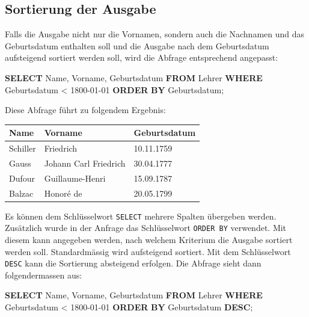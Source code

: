 \documentclass[
  nswissgerman,
  a4paper,
  DIV=11,
  numbers=noendperiod,
  ngerman]{scrreprt}
\newenvironment{Shaded}{\begin{snugshade}}{\end{snugshade}}
\newcommand{\KeywordTok}[1]{\textcolor[rgb]{0.00,0.23,0.31}{\textbf{#1}}}
\newcommand{\NormalTok}[1]{\textcolor[rgb]{0.00,0.23,0.31}{#1}}
\newcommand{\OperatorTok}[1]{\textcolor[rgb]{0.37,0.37,0.37}{#1}}
\newcommand{\StringTok}[1]{\textcolor[rgb]{0.13,0.47,0.30}{#1}}
\newcounter{none} %
\begin{document}
\subsection{Sortierung der Ausgabe}\label{sortierung-der-ausgabe}

Falls die Ausgabe nicht nur die Vornamen, sondern auch die Nachnamen und
das Geburtsdatum enthalten soll und die Ausgabe nach dem Geburtsdatum
aufsteigend sortiert werden soll, wird die Abfrage entsprechend
angepasst:

\begin{Shaded}
\begin{Highlighting}[numbers=left,,]
\KeywordTok{SELECT}\NormalTok{ Name, Vorname, Geburtsdatum}
\KeywordTok{FROM}\NormalTok{ Lehrer}
\KeywordTok{WHERE}\NormalTok{ Geburtsdatum }\OperatorTok{\textless{}} \StringTok{\textquotesingle{}1800{-}01{-}01\textquotesingle{}}
\KeywordTok{ORDER} \KeywordTok{BY}\NormalTok{ Geburtsdatum;}
\end{Highlighting}
\end{Shaded}

Diese Abfrage führt zu folgendem Ergebnis:

{\def\LTcaptype{none} %
\begin{longtable}[]{@{}lll@{}}
\toprule\noalign{}
Name & Vorname & Geburtsdatum \\
\midrule\noalign{}
\endhead
\bottomrule\noalign{}
\endlastfoot
Schiller & Friedrich & 10.11.1759 \\
Gauss & Johann Carl Friedrich & 30.04.1777 \\
Dufour & Guillaume-Henri & 15.09.1787 \\
Balzac & Honoré de & 20.05.1799 \\
\end{longtable}
}

Es können dem Schlüsselwort \texttt{SELECT} mehrere Spalten übergeben
werden. Zusätzlich wurde in der Anfrage das Schlüsselwort
\texttt{ORDER\ BY} verwendet. Mit diesem kann angegeben werden, nach
welchem Kriterium die Ausgabe sortiert werden soll. Standardmässig wird
aufsteigend sortiert. Mit dem Schlüsselwort \texttt{DESC} kann die
Sortierung absteigend erfolgen. Die Abfrage sieht dann folgendermassen
aus:

\begin{Shaded}
\begin{Highlighting}[numbers=left,,]
\KeywordTok{SELECT}\NormalTok{ Name, Vorname, Geburtsdatum}
\KeywordTok{FROM}\NormalTok{ Lehrer}
\KeywordTok{WHERE}\NormalTok{ Geburtsdatum }\OperatorTok{\textless{}} \StringTok{\textquotesingle{}1800{-}01{-}01\textquotesingle{}}
\KeywordTok{ORDER} \KeywordTok{BY}\NormalTok{ Geburtsdatum }\KeywordTok{DESC}\NormalTok{;}
\end{Highlighting}
\end{Shaded}
\end{document}

